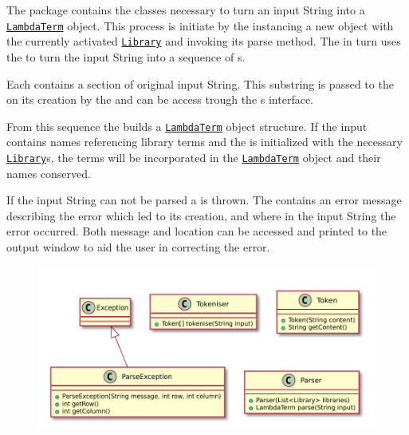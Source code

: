 The \texttt{} package contains the classes necessary to turn an input String into a \texttt{\hyperref[type:edu.kit.wavelength.client.model.term.LambdaTerm]{LambdaTerm}} object.
This process is initiate by the \texttt{} instancing a new \texttt{} object with the currently activated \texttt{\hyperref[type:edu.kit.wavelength.client.model.libraray.Library]{Library}} and invoking its parse method. The \texttt{} in turn uses the \texttt{} to turn the input String into a sequence of \texttt{}s. 

Each \texttt{} contains a section of original input String. This substring is passed to the \texttt{} on its creation by the \texttt{} and can be access trough the \texttt{}s interface.

From this sequence the \texttt{} builds a \texttt{\hyperref[type:edu.kit.wavelength.client.model.term.LambdaTerm]{LambdaTerm}} object structure.
If the input contains names referencing library terms and the \texttt{} is initialized with the necessary \texttt{\hyperref[type:edu.kit.wavelength.client.model.libraray.Library]{Library}}s, the terms will be incorporated in the \texttt{\hyperref[type:edu.kit.wavelength.client.model.term.LambdaTerm]{LambdaTerm}} object and their names conserved.
 
If the input String can not be parsed a \texttt{} is thrown.
The \texttt{} contains an error message describing the error which led to its creation, and where in the input String the error occurred.
Both message and location can be accessed and printed to the output window to aid the user in correcting the error.

\begin{figure}[H]
	\centering
	\includegraphics[width=\textwidth]{packageDiagrams/parsingPackage}
\end{figure}
